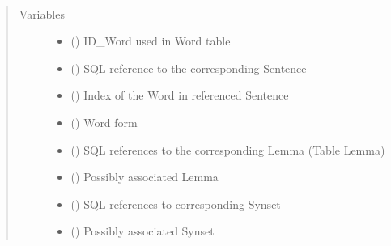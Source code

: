 \documentclass[letterpaper,10pt,english]{sphinxmanual}
\begin{document}
\begin{fulllineitems}
\label{\detokenize{index:loacore.classes.classes.Word}}~\begin{quote}\begin{description}
\item[{Variables}] \leavevmode\begin{itemize}
\item {} 
 () \textendash{} ID\_Word used in Word table

\item {} 
 () \textendash{} SQL reference to the corresponding Sentence

\item {} 
 () \textendash{} Index of the Word in referenced Sentence

\item {} 
 () \textendash{} Word form

\item {} 
 () \textendash{} SQL references to the corresponding Lemma (Table Lemma)

\item {} 
 () \textendash{} Possibly associated Lemma

\item {} 
 () \textendash{} SQL references to corresponding Synset

\item {} 
 ({\hyperref[\detokenize{index:loacore.classes.classes.Synset}]{}}) \textendash{} Possibly associated Synset


\end{itemize}
\end{description}
\end{quote}
\end{fulllineitems}
\end{document}
